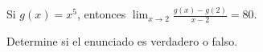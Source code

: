 \item Si $g(x) = x^5$, entonces $\lim_{x \to 2} \frac{g(x) - g(2)}{x - 2} = 80$.
\par
Determine si el enunciado es verdadero o falso.

